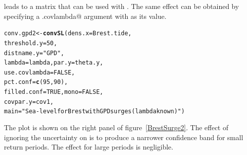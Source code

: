 \documentclass[11pt,a4paper]{report}\usepackage[]{graphicx}\usepackage[]{color}
\makeatletter
\newcommand{\hlnum}[1]{\textcolor[rgb]{0.686,0.059,0.569}{#1}}%
\newcommand{\hlstr}[1]{\textcolor[rgb]{0.192,0.494,0.8}{#1}}%
\newcommand{\hlstd}[1]{\textcolor[rgb]{0.345,0.345,0.345}{#1}}%
\newcommand{\hlkwb}[1]{\textcolor[rgb]{0.69,0.353,0.396}{#1}}%
\newcommand{\hlkwc}[1]{\textcolor[rgb]{0.333,0.667,0.333}{#1}}%
\newcommand{\hlkwd}[1]{\textcolor[rgb]{0.737,0.353,0.396}{\textbf{#1}}}%
\newenvironment{kframe}{%
 \def\at@end@of@kframe{}%
 \ifinner\ifhmode%
  \def\at@end@of@kframe{\end{minipage}}%
  \begin{minipage}{\columnwidth}%
 \fi\fi%
 \def\FrameCommand##1{\hskip\@totalleftmargin \hskip-\fboxsep
 \colorbox{shadecolor}{##1}\hskip-\fboxsep
     \hskip-\linewidth \hskip-\@totalleftmargin \hskip\columnwidth}%
 \MakeFramed {\advance\hsize-\width
   \@totalleftmargin\z@ \linewidth\hsize
   \@setminipage}}%
 {\par\unskip\endMakeFramed%
 \at@end@of@kframe}
\newenvironment{knitrout}{}{} %
\makeatother
\begin{document}
\noindent
leads to a matrix that can be used with \verb@convSL@. The same
effect can be obtained by specifying a \verb@use.covlambda@ argument
with \verb@FALSE@ as its value. 
\begin{knitrout}
\color{fgcolor}\begin{kframe}
\begin{alltt}
\hlstd{conv.gpd2} \hlkwb{<-} \hlkwd{convSL}\hlstd{(}\hlkwc{dens.x} \hlstd{= Brest.tide,}
                    \hlkwc{threshold.y} \hlstd{=} \hlnum{50}\hlstd{,}
                    \hlkwc{distname.y} \hlstd{=} \hlstr{"GPD"}\hlstd{,}
                    \hlkwc{lambda} \hlstd{= lambda,} \hlkwc{par.y} \hlstd{= theta.y,}
                    \hlkwc{use.covlambda} \hlstd{=} \hlnum{FALSE}\hlstd{,}
                    \hlkwc{pct.conf} \hlstd{=} \hlkwd{c}\hlstd{(}\hlnum{95}\hlstd{,} \hlnum{90}\hlstd{),}
                    \hlkwc{filled.conf} \hlstd{=} \hlnum{TRUE}\hlstd{,} \hlkwc{mono} \hlstd{=} \hlnum{FALSE}\hlstd{,}
                    \hlkwc{covpar.y} \hlstd{= cov1,}
                    \hlkwc{main} \hlstd{=} \hlstr{"Sea-level for Brest with GPD surges (lambda known)"}\hlstd{)}
\end{alltt}
\end{kframe}
\end{knitrout}
\noindent
The plot is shown on the right panel of
figure~\ref{BrestSurge2}. The effect of ignoring the uncertainty on
\verb@lambda@ is to produce a narrower confidence band for small
return periods. The effect for large periods is negligible.
\end{document}
